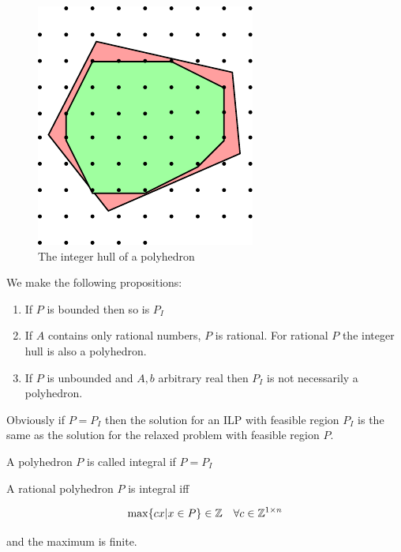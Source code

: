 \begin{figure}[hbt]
\begin{center}
\includegraphics{./images/integerHull}
\end{center}
\caption{The integer hull of a polyhedron}
\label{Fig:integerHull}
\end{figure}

We make the following propositions:

\begin{enumerate}
\item If $P$ is bounded then so is $P_I$
\item If $A$ contains only rational numbers, $P$ is rational. For rational $P$ the integer hull is also a polyhedron.
\item If $P$ is unbounded and $A,b$ arbitrary real then $P_I$ is not necessarily a polyhedron.
\end{enumerate}

Obviously if $P=P_I$ then the solution for an ILP with feasible region $P_I$ is the same as the solution for the relaxed problem with feasible region $P$.

\begin{Def} A polyhedron $P$ is called integral if $P=P_I$\end{Def}

\begin{thm}\label{Thm:polyIntegrality} A rational polyhedron $P$ is integral iff

\[\max \{cx | x\in P\}\in \mathbb{Z}\quad \forall c\in \mathbb{Z}^{1\times n}\]

and the maximum is finite.
\end{thm}

